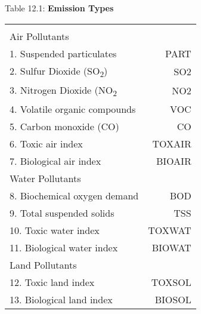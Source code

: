 \documentclass{article}
\begin{document}
\newpage
\begin{center}
\begin{large}
{\centering Table 12.1: \textbf{Emission Types} \par}


\begin{tabular}{l r}
\hline\\[5pt]


Air Pollutants\\
1. \hspace{10pt} Suspended particulates & PART\\
2. \hspace{10pt} Sulfur Dioxide (SO\textsubscript{2}) & SO2\\
3. \hspace{10pt} Nitrogen Dioxide (NO\textsubscript{2} & NO2\\
4. \hspace{10pt} Volatile organic compounds & VOC\\
5. \hspace{10pt} Carbon monoxide (CO) & CO\\
6. \hspace{10pt} Toxic air index & TOXAIR\\
7. \hspace{10pt} Biological air index & BIOAIR\\[15pt]

Water Pollutants\\
8. \hspace{10pt} Biochemical oxygen demand & BOD\\
9. \hspace{10pt} Total suspended solids & TSS\\
10. \hspace{10pt} Toxic water index & TOXWAT\\
11. \hspace{10pt} Biological water index & BIOWAT\\[15pt]

Land Pollutants\\
12. \hspace{10pt} Toxic land index & TOXSOL\\
13. \hspace{10pt} Biological land index & BIOSOL\\[20pt]

\hline
\end{tabular}
\end{large}
\end{center}
\end{document}
